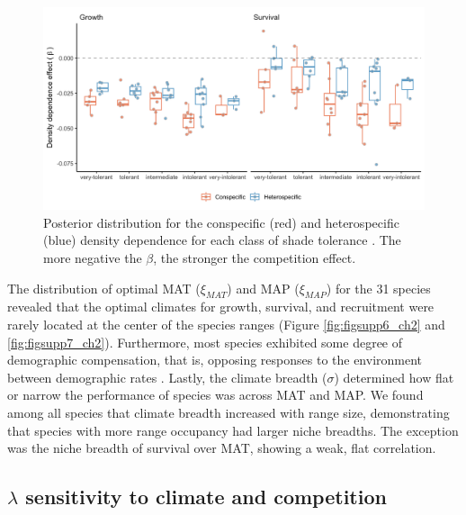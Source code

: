 \hypertarget{fig:crossComp}{%
\begin{figure}
\centering
\includegraphics[width=1\textwidth,height=\textheight]{manuscript/figs/crossComp.png}
\caption[{Posterior distribution for the conspecific (red) and
heterospecific (blue) density dependence for each class of shade
tolerance \citep{burns1990silvics}.}]{Posterior distribution for the
conspecific (red) and heterospecific (blue) density dependence for each
class of shade tolerance \citep{burns1990silvics}. The more negative the
\(\beta\), the stronger the competition effect.}
\label{fig:crossComp}
\end{figure}
}

The distribution of optimal MAT (\(\xi_{MAT}\)) and MAP (\(\xi_{MAP}\))
for the 31 species revealed that the optimal climates for growth,
survival, and recruitment were rarely located at the center of the
species ranges (Figure \ref{fig:figsupp6_ch2} and \ref{fig:figsupp7_ch2}). Furthermore, most species exhibited
some degree of demographic compensation, that is, opposing responses to
the environment between demographic rates \citep{Villellas2015}. Lastly,
the climate breadth (\(\sigma\)) determined how flat or narrow the
performance of species was across MAT and MAP. We found among all
species that climate breadth increased with range size, demonstrating
that species with more range occupancy had larger niche breadths. The
exception was the niche breadth of survival over MAT, showing a weak,
flat correlation.\\

\hypertarget{lambda-sensitivity-to-climate-and-competition}{%
\subsection{\texorpdfstring{\(\lambda\) sensitivity to climate and
competition}{\textbackslash lambda sensitivity to climate and competition}}\label{lambda-sensitivity-to-climate-and-competition}}

